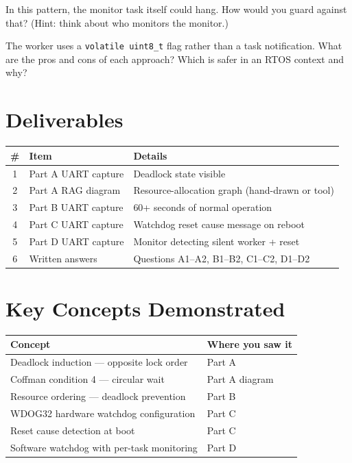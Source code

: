 \documentclass[11pt, a4paper]{article}
\begin{document}
\begin{questionbox}[~D1]
  In this pattern, the monitor task itself could hang. How would you guard against
  that? (Hint: think about who monitors the monitor.)
\end{questionbox}

\begin{questionbox}[~D2]
  The worker uses a \texttt{volatile uint8\_t} flag rather than a task notification.
  What are the pros and cons of each approach? Which is safer in an RTOS context and
  why?
\end{questionbox}

\section{Deliverables}

\renewcommand{\arraystretch}{1.3}
\begin{tabular}{@{} c p{4.5cm} p{7cm} @{}}
  \toprule
  \textbf{\#} & \textbf{Item} & \textbf{Details} \\
  \midrule
  1 & Part A UART capture  & Deadlock state visible \\
  2 & Part A RAG diagram   & Resource-allocation graph (hand-drawn or tool) \\
  3 & Part B UART capture  & 60+ seconds of normal operation \\
  4 & Part C UART capture  & Watchdog reset cause message on reboot \\
  5 & Part D UART capture  & Monitor detecting silent worker + reset \\
  6 & Written answers      & Questions A1--A2, B1--B2, C1--C2, D1--D2 \\
  \bottomrule
\end{tabular}
\renewcommand{\arraystretch}{1}

\section{Key Concepts Demonstrated}

\renewcommand{\arraystretch}{1.3}
\begin{tabular}{@{} p{7cm} p{6cm} @{}}
  \toprule
  \textbf{Concept} & \textbf{Where you saw it} \\
  \midrule
  Deadlock induction --- opposite lock order    & Part A \\
  Coffman condition 4 --- circular wait         & Part A diagram \\
  Resource ordering --- deadlock prevention     & Part B \\
  WDOG32 hardware watchdog configuration        & Part C \\
  Reset cause detection at boot                 & Part C \\
  Software watchdog with per-task monitoring    & Part D \\
  \bottomrule
\end{tabular}
\renewcommand{\arraystretch}{1}
\end{document}
